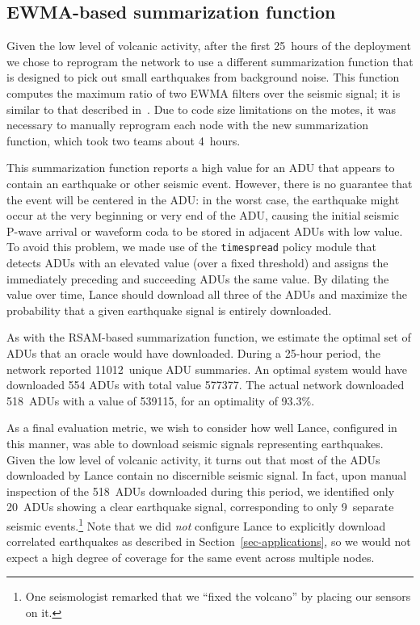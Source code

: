 \documentclass[lettersize]{sig-alternate-konrad}
\begin{document}
\subsection{EWMA-based summarization function}
\label{sec-ewma-deployment}

Given the low level of volcanic activity, after the first 25~hours of
the deployment we chose to reprogram the network to use a different
summarization function that is designed to pick out small earthquakes
from background noise. This function computes the maximum ratio of two
EWMA filters over the seismic signal; it is similar to that described
in~\cite{volcano-osdi06}. Due to code size limitations on
the motes, it was necessary to manually reprogram each node with the
new summarization function, which took two teams about 4~hours.

This summarization function reports a high value for an ADU
that appears to contain an earthquake or other seismic event. 
However, there is no guarantee that the event will be centered in the
ADU: in the worst case, the earthquake might occur at the very
beginning or very end of the ADU, causing the initial seismic P-wave arrival
or waveform coda to be stored in adjacent ADUs with low value.
To avoid this problem, we made use of the {\tt timespread} policy
module that detects ADUs with
an elevated value (over a fixed threshold) and assigns the
immediately preceding and succeeding ADUs the same value.
By dilating the value over time, Lance should download
all three of the ADUs and maximize the probability that a given
earthquake signal is entirely downloaded.

As with the RSAM-based summarization function, we estimate the optimal set of
ADUs that an oracle would have downloaded. During a 25-hour period, the
network reported 11012~unique ADU summaries. An optimal system would have
downloaded 554 ADUs with total value 577377.  The actual network
downloaded 518~ADUs with a value of 539115, for an optimality of 93.3\%. 

As a final evaluation metric, we wish to consider how well Lance,
configured in this manner, was able to download seismic signals
representing earthquakes. Given the low level of volcanic activity, 
it turns out that most of the ADUs downloaded by Lance contain no 
discernible seismic signal. In fact, upon manual inspection of the
518~ADUs downloaded during this period, we identified only 20~ADUs
showing a clear earthquake signal, corresponding to only 9~separate
seismic events.\footnote{One seismologist remarked that we 
``fixed the volcano'' by placing our sensors on it.}
Note that we did {\em not} configure Lance to explicitly download 
correlated earthquakes as described in Section~\ref{sec-applications},
so we would not expect a high degree of coverage for the same event
across multiple nodes.
\end{document}

